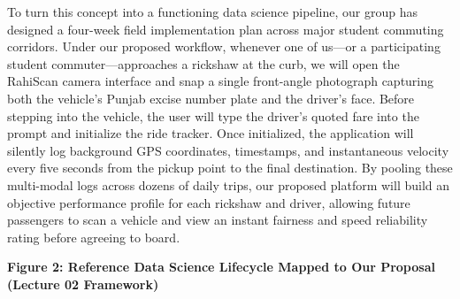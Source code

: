 \documentclass[12pt, a4paper]{article}
\newcommand{\subsubheading}[1]{%
  \vspace{6pt}%
  {\noindent\fontsize{12pt}{15pt}\selectfont\bfseries\color{navyblue}#1\par}%
  \vspace{2pt}%
}
\begin{document}
To turn this concept into a functioning data science pipeline, our group has designed a four-week field implementation plan across major student commuting corridors. Under our proposed workflow, whenever one of us---or a participating student commuter---approaches a rickshaw at the curb, we will open the RahiScan camera interface and snap a single front-angle photograph capturing both the vehicle's Punjab excise number plate and the driver's face. Before stepping into the vehicle, the user will type the driver's quoted fare into the prompt and initialize the ride tracker. Once initialized, the application will silently log background GPS coordinates, timestamps, and instantaneous velocity every five seconds from the pickup point to the final destination. By pooling these multi-modal logs across dozens of daily trips, our proposed platform will build an objective performance profile for each rickshaw and driver, allowing future passengers to scan a vehicle and view an instant fairness and speed reliability rating before agreeing to board.

\subsubheading{Figure 2: Reference Data Science Lifecycle Mapped to Our Proposal (Lecture 02 Framework)}

\begin{center}
\end{center}
\end{document}
